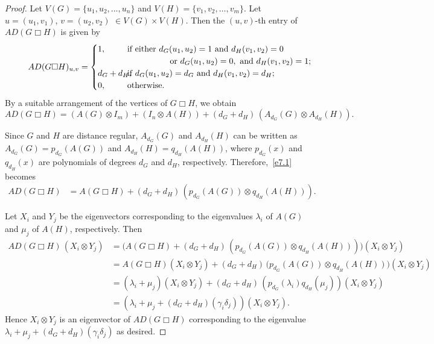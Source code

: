 \documentclass[12pt]{article}
\numberwithin{equation}{section}
\begin{document}
		\begin{proof}
			Let $V(G)=\{u_1,u_2,\dots,u_n\}$ and $V(H)=\{v_1,v_2,\dots,v_m\}$. Let $u=(u_1,v_1)$, $v=(u_2,v_2)$ $\in V(G) \times V(H)$. Then the $(u,v)$-th entry of $AD(G \Box H)$ is given by
			\[AD(G \Box H)_{u,v}=
			\begin{cases}
				1, & \hspace{-8cm} \text{if either } d_G(u_1,u_2)=1 \text{ and } d_H(v_1,v_2)=0 \\
				\hspace{3cm} \text{or } d_G(u_1,u_2)=0, \text{ and } d_H(v_1,v_2)=1;\\
				d_G+d_H, & \hspace{-8cm} \text{if } d_G(u_1,u_2)=d_G \text{ and } d_H(v_1,v_2)=d_H;\\
				0, & \hspace{-8cm} \text{otherwise}.
			\end{cases}
			\] 
    By a suitable arrangement of the vertices of $G \Box H$, we obtain
	\begin{equation}\label{e7.1}
	AD(G \Box H)
	= (A(G) \otimes I_m) + (I_n \otimes A(H))
	+ (d_G+d_H)\, (A_{d_G}(G) \otimes A_{d_H}(H)).
	\end{equation}

	Since $G$ and $H$ are distance regular,
	$A_{d_G}(G)$ and $A_{d_H}(H)$ can be written as 
	$A_{d_G}(G) = p_{d_G}(A(G))$ and $A_{d_H}(H) = q_{d_H}(A(H))$, 
	where $p_{d_G}(x)$ and $q_{d_H}(x)$ are polynomials of degrees $d_G$ and $d_H$, respectively. Therefore,~\eqref{e7.1} becomes
	\[
	\begin{aligned}
	AD(G \Box H) 
	&= A(G \Box H) + (d_G+d_H)\, (p_{d_G}(A(G)) \otimes q_{d_H}(A(H))).
	\end{aligned}
	\]

	Let $X_i$ and $Y_j$ be the eigenvectors corresponding to the eigenvalues 
	$\lambda_i$ of $A(G)$ and $\mu_j$ of $A(H)$, respectively. Then
	\[
	\begin{aligned}
	AD(G \Box H) \, (X_i \otimes Y_j)
	&= \Big(A(G \Box H) 
	+ (d_G+d_H)\, (p_{d_G}(A(G)) \otimes q_{d_H}(A(H)))\Big)(X_i \otimes Y_j) \\
	&= A(G \Box H)(X_i \otimes Y_j)
	+  (d_G+d_H)\, \Big(p_{d_G}(A(G)) \otimes q_{d_H}(A(H))\Big)(X_i \otimes Y_j) \\
	&= (\lambda_i + \mu_j)(X_i \otimes Y_j)
	+ (d_G+d_H)\, (p_{d_G}(\lambda_i) q_{d_H}(\mu_j)) (X_i \otimes Y_j)\\
	&= (\lambda_i + \mu_j+(d_G+d_H)(\gamma_i \delta_j)) (X_i \otimes Y_j).
	\end{aligned}
	\]
	Hence $X_i \otimes Y_j$ is an eigenvector of $AD(G \Box H)$
	corresponding to the eigenvalue $\lambda_i + \mu_j+(d_G+d_H)(\gamma_i \delta_j)$ as desired.
		\end{proof}
		
\end{document}
